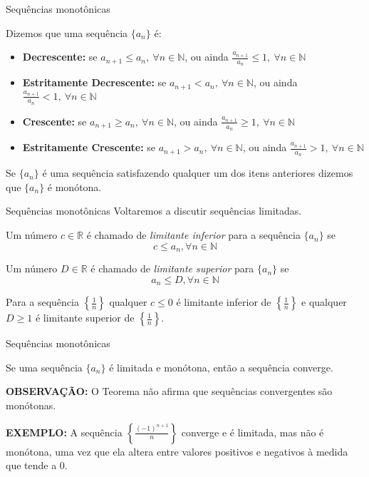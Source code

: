 \documentclass[hyperref={pdfpagelabels=false}]{beamer}
\begin{document}
\begin{frame}{Sequências monotônicas}
 \begin{definition}
  Dizemos que uma sequência $\{a_n\}$ é: \pause
  \begin{itemize}
   \item {\bf Decrescente:} se $a_{n+1} \leq a_n,~\forall n \in \mathbb{N}$, ou ainda $\displaystyle \frac{a_{n+1}}{a_n} \leq 1,~\forall n \in \mathbb{N}$ \pause
   \item {\bf Estritamente Decrescente:} se $a_{n+1} < a_n,~\forall n \in \mathbb{N}$, ou ainda $\displaystyle \frac{a_{n+1}}{a_n} < 1,~\forall n \in \mathbb{N}$ \pause
   \item {\bf Crescente:} se $a_{n+1} \geq a_n,~\forall n \in \mathbb{N}$, ou ainda $\displaystyle \frac{a_{n+1}}{a_n} \geq 1,~\forall n \in \mathbb{N}$ \pause
   \item {\bf Estritamente Crescente:} se $a_{n+1} > a_n,~\forall n \in \mathbb{N}$, ou ainda $\displaystyle \frac{a_{n+1}}{a_n} > 1,~\forall n \in \mathbb{N}$
  \end{itemize} \pause
  
  Se $\{a_n\}$ é uma sequência satisfazendo qualquer um dos itens anteriores dizemos que $\{a_n\}$ é monótona.

 \end{definition}

\end{frame}

\begin{frame}{Sequências monotônicas}
 Voltaremos a discutir sequências limitadas.
 \begin{definition}
  Um número $c \in \mathbb{R}$ é chamado de \emph{limitante inferior} para a sequência $\{a_n\}$ se $$c \leq a_n, \forall n \in \mathbb{N}$$
  
  Um número $D \in \mathbb{R}$ é chamado de \emph{limitante superior} para $\{a_n\}$ se $$a_n \leq D, \forall n \in \mathbb{N}$$
 \end{definition} \pause

  \begin{example}
   Para a sequência $\left\{\displaystyle\frac{1}{n}\right\}$ qualquer $c \leq 0$ é limitante inferior de $\left\{\displaystyle\frac{1}{n}\right\}$ e qualquer $D \geq 1$ é limitante superior de $\left\{\displaystyle\frac{1}{n}\right\}$.
 \end{example}
\end{frame}

\begin{frame}{Sequências monotônicas}
\begin{theorem}
 Se uma sequência $\{a_n\}$ é limitada e monótona, então a sequência converge.
\end{theorem} \pause

{\bf OBSERVAÇÃO:} O Teorema não afirma que sequências convergentes são monótonas. \pause 

{\bf EXEMPLO:} A sequência $\left\{\displaystyle\frac{(-1)^{n+1}}{n}\right\}$ converge e é limitada, mas não é monótona, uma vez que ela altera entre valores positivos e negativos à medida que tende a $0$.

\end{frame}
\end{document}
